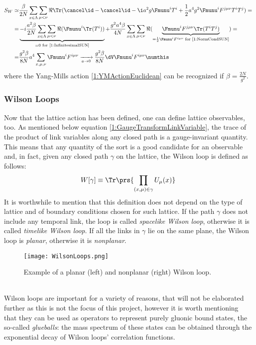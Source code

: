 \begin{align*}
    S_W \simeq& \frac{\beta}{2N} \sum_{x\in\Lambda}\sum_{\mu<\nu} \Re\Tr(\cancel\id - \cancel\id - \i a^2 g \Fmunu^i T^i + \frac12a^4 g^2 \Fmunu^i F^{j\mu\nu}T^iT^j) = \\
    =& \underbrace{-i\frac{a^2\beta}{2N} \sum_{x\in\Lambda}\sum_{\mu<\nu} \Re(\Fmunu^i \Tr(T^i))}_{=0\text{ for \eqref{1:InfinitesimalSUN}}} + \frac{g^2a^4\beta}{4N} \sum_{x\in\Lambda}\sum_{\mu<\nu} \Re(\underbrace{\Fmunu^i F^{j\mu\nu}\Tr(T^iT^j)}_{=\frac12\Fmunu^i F^{i\mu\nu}\text{ for \eqref{1:NormCondSUN}}}) = \\
    =& \frac{g^2\beta}{8N} a^4\sum_{x,\mu,\nu}\Fmunu^i F^{i\mu\nu} \xrightarrow[a\to0]{} \frac{g^2\beta}{8N} \dV\Fmunu^i F^{i\mu\nu} \numthis \label{1:WilsonSmalla}
\end{align*}
where the Yang-Mills action \eqref{1:YMActionEuclidean} can be recognized if $\beta = \frac{2N}{g^2}$.

\subsubsection{Wilson Loops}
Now that the lattice action has been defined, one can define lattice observables, too.
As mentioned below equation \eqref{1:GaugeTransformLinkVariable}, the trace of the product of link variables along any closed path is a gauge-invariant quantity.
This means that any quantity of the sort is a good candidate for an observable and, in fact, given any closed path $\gamma$ on the lattice, the Wilson loop is defined as follows:
\begin{equation}
    W[\gamma] \equiv \Tr\prs{\prod_{(x,\mu)\in\gamma}U_\mu(x)} \label{1:WilsonLoop}
\end{equation}
It is worthwhile to mention that this definition does not depend on the type of lattice and of boundary conditions chosen for such lattice.
If the path $\gamma$ does not include any temporal link, the loop is called \emph{spacelike Wilson loop}, otherwise it is called \emph{timelike Wilson loop}.
If all the links in $\gamma$ lie on the same plane, the Wilson loop is \emph{planar}, otherwise it is \emph{nonplanar}.
\begin{figure}[!htbp]
    \centering
    \texttt{[image: WilsonLoops.png]}
    \caption{Example of a planar (left) and nonplanar (right) Wilson loop.}
\end{figure}\\
Wilson loops are important for a variety of reasons, that will not be elaborated further as this is not the focus of this project, however it is worth mentioning that they can be used as operators to represent purely gluonic bound states, the so-called \emph{glueballs}: the mass spectrum of these states can be obtained through the exponential decay of Wilson loops' correlation functions.

